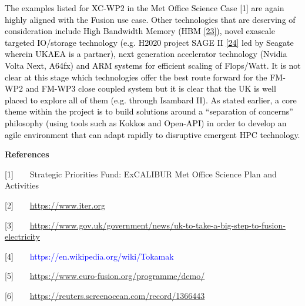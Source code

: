 \documentclass[a4paper]{article}
\newcommand\textstyleInternetlink[1]{\textcolor{blue}{#1}}
\begin{document}
\textcolor{black}{The examples listed for XC-WP2 in the Met Office Science Case [1] are again highly aligned with the
Fusion use case. Other technologies that are deserving of consideration include High Bandwidth Memory (HBM
}\href{https://en.wikipedia.org/wiki/High_Bandwidth_Memory}{\textstyleInternetlink{\textcolor{black}{[23]}}}\textcolor{black}{),
novel exascale targeted IO/storage }\textcolor{black}{technology (e.g. H2020 project SAGE II
}\href{http://sagestorage.eu/about/overview}{\textstyleInternetlink{\textcolor{black}{[24]}}}\textcolor{black}{ led by
Seagate wherein UKAEA is a partner), next generation accelerator technology (Nvidia Volta Next, A64fx) and ARM systems
for efficient scaling of Flops/Watt. It is not clear at this stage which technologies offer the best route forward for
the FM-WP2 and FM-WP3 close coupled system but it is clear that the UK is well placed to explore all of them (e.g.
through Isambard II). As stated earlier, a core theme within the project is to build solutions around a ``separation of
concerns'' philosophy (using tools such as Kokkos and Open-API) in order to develop an agile environment that can adapt
rapidly to disruptive emergent HPC technology.}


\bigskip


\bigskip


\bigskip


\bigskip


\bigskip


\bigskip


\bigskip


\bigskip


\bigskip


\bigskip

\textbf{\textcolor[rgb]{0.12156863,0.28627452,0.49019608}{References}}


\bigskip

\textcolor{black}{[1]\ \ \ \ }Strategic Priorities Fund: ExCALIBUR Met Office Science Plan and Activities

[2]\ \ \ \ \url{https://www.iter.org}

[3]\ \ \ \ \url{https://www.gov.uk/government/news/uk-to-take-a-big-step-to-fusion-electricity}

\textstyleInternetlink{\textcolor{black}{[4]}\ \ \ \ https://en.wikipedia.org/wiki/Tokamak}

[5]\ \ \ \ \url{https://www.euro-fusion.org/programme/demo/}

[6]\ \ \ \ \url{https://reuters.screenocean.com/record/1366443}
\end{document}

